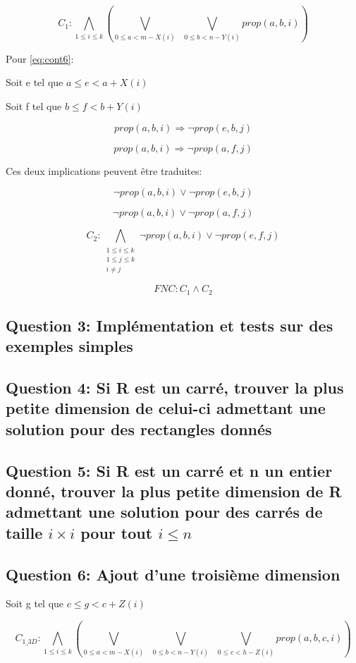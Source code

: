 \documentclass[a4paper,10pt]{article}
\begin{document}
$$C_1 : \bigwedge_{1 \leq i \leq k} ( \bigvee_{0 \leq a < m - X(i)}\;\; \bigvee_{0 \leq b < n - Y(i)} prop(a,b,i)) $$


Pour \eqref{eq:cont6}:

Soit e tel que $a \leq e < a + X(i)$

Soit f tel que $b \leq f < b + Y(i)$

$$prop(a,b,i) \Rightarrow \neg prop(e,b,j)$$

$$prop(a,b,i) \Rightarrow \neg prop(a,f,j)$$

Ces deux implications peuvent être traduites:

$$\neg prop(a,b,i) \lor \neg prop(e,b,j)$$

$$\neg prop(a,b,i) \lor \neg prop(a,f,j)$$

$$C_{2} : \bigwedge_{\substack{1 \leq i \leq k \\ 1 \leq j \leq k \\ i \neq j}} \neg prop(a,b,i) \lor \neg prop(e,f,j)$$


\begin{center}
$$FNC: C_1 \wedge C_2$$
\end{center}

\subsection{Question 3: Implémentation et tests sur des exemples simples}

\subsection{Question 4: Si R est un carré, trouver la plus petite dimension de celui-ci admettant une solution pour des rectangles donnés}

\subsection{Question 5: Si R est un carré et n un entier donné, trouver la plus petite dimension de R admettant une solution pour des carrés de taille $i \times i$ pour tout $i \leq n$}

\subsection{Question 6: Ajout d'une troisième dimension}

Soit g tel que $c \leq g < c + Z(i)$

$$C_{1\_3D} : \bigwedge_{1 \leq i \leq k} ( \bigvee_{0 \leq a < m - X(i)}\;\; \bigvee_{0 \leq b < n - Y(i)}\;\; \bigvee_{0 \leq c < h - Z(i)} prop(a,b,c,i)) $$
\end{document}

